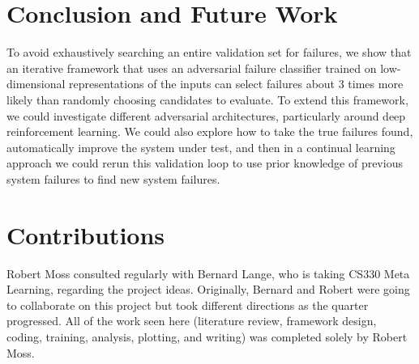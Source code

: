 

\section{Conclusion and Future Work}
To avoid exhaustively searching an entire validation set for failures, we show that an iterative framework that uses an adversarial failure classifier trained on low-dimensional representations of the inputs can select failures about $3$ times more likely than randomly choosing candidates to evaluate.
To extend this framework, we could investigate different adversarial architectures, particularly around deep reinforcement learning.
We could also explore how to take the true failures found, automatically improve the system under test, and then in a continual learning approach we could rerun this validation loop to use prior knowledge of previous system failures to find new system failures.

\section{Contributions}
Robert Moss consulted regularly with Bernard Lange, who is taking CS330 Meta Learning, regarding the project ideas.
Originally, Bernard and Robert were going to collaborate on this project but took different directions as the quarter progressed.
All of the work seen here (literature review, framework design, coding, training, analysis, plotting, and writing) was completed solely by Robert Moss.
